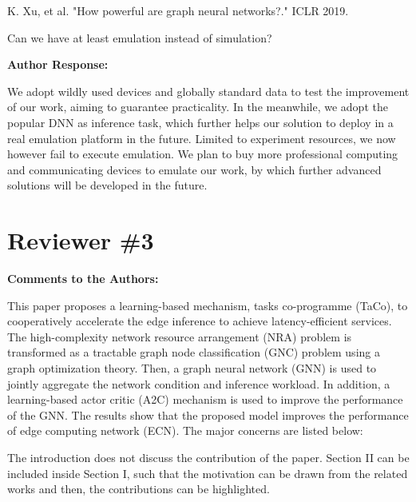 \documentclass{ar2rc}
\begin{document}
K. Xu, et al. "How powerful are graph neural networks?." ICLR 2019.









\begin{tcolorbox}[
   title={Reviewer 2: Comment 6},
   colback=gray!10,%
   colframe=black,%
   width=\linewidth,%
   arc=1mm, auto outer arc,
   boxrule=0.5pt,
]
Can we have at least emulation instead of simulation?
\end{tcolorbox}

\textbf{Author Response:}

\noindent We adopt wildly used devices and globally standard data to test the improvement of our work, aiming to guarantee practicality. In the meanwhile, we adopt the popular DNN as inference task, which further helps our solution to deploy in a real emulation platform in the future. Limited to experiment resources, we now however fail to execute emulation. We plan to buy more professional computing and communicating devices to emulate our work, by which further advanced solutions will be developed in the future.


\section{Reviewer \#3}

\textbf{Comments to the Authors:}

\noindent This paper proposes a learning-based mechanism, tasks co-programme (TaCo), to cooperatively accelerate the edge inference to achieve latency-efficient services. The high-complexity network resource arrangement (NRA) problem is transformed as a tractable graph node classification (GNC) problem using a graph optimization theory. Then, a graph neural network (GNN) is used to jointly aggregate the network condition and inference workload. In addition, a learning-based actor critic (A2C) mechanism is used to improve the performance of the GNN. The results show that the proposed model improves the performance of edge computing network (ECN). The major concerns are listed below:

\begin{tcolorbox}[
   title={Reviewer 3: Comment 1},
   colback=gray!10,%
   colframe=black,%
   width=\linewidth,%
   arc=1mm, auto outer arc,
   boxrule=0.5pt,
]
The introduction does not discuss the contribution of the paper. Section II can be included inside Section I, such that the motivation can be drawn from the related works and then, the contributions can be highlighted.
\end{tcolorbox}
\end{document}
